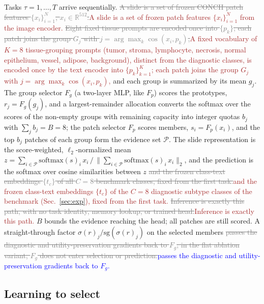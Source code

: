 \documentclass{article}
\newif\ifmarkup \markuptrue
\newcommand{\repc}[3]{\ifmarkup\textcolor{gray}{\sout{#2}}\textcolor{#1}{#3}\else#3\fi}
\newcommand{\repB}[2]{\repc{brown}{#1}{#2}}   %
\newcommand{\repL}[2]{\repc{blue}{#1}{#2}}    %
\newcommand{\Fg}{F_g}
\newcommand{\Fp}{F_p}
\newcommand{\Psel}{\mathcal{P}}
\begin{document}
Tasks $\tau=1,\ldots,T$ arrive sequentially. \repB{A slide is a set of frozen CONCH patch features $\{x_i\}_{i=1}^{N}$, $x_i\in\mathbb{R}^{512}$.}{A slide is a set of frozen patch features $\{x_i\}_{i=1}^{N}$ from the image encoder.} \repB{Eight fixed tissue prompts are encoded once into $\{p_k\}$; each patch joins the group $G_j$ with $j=\arg\max_k\cos(x_i,p_k)$,}{A fixed vocabulary of $K=8$ tissue-grouping prompts (tumor, stroma, lymphocyte, necrosis, normal epithelium, vessel, adipose, background), distinct from the diagnostic classes, is encoded once by the text encoder into $\{p_k\}_{k=1}^{K}$; each patch joins the group $G_j$ with $j=\arg\max_k\cos(x_i,p_k)$,} and each group is summarized by its mean $g_j$. The group selector $\Fg$ (a two-layer MLP, like $\Fp$) scores the prototypes, $r_j=\Fg(g_j)$, and a largest-remainder allocation converts the softmax over the scores of the non-empty groups with remaining capacity into integer quotas $b_j$ with $\sum_j b_j=B=8$; the patch selector $\Fp$ scores members, $s_i=\Fp(x_i)$, and the top $b_j$ patches of each group form the evidence set $\Psel$. The slide representation is the score-weighted, $\ell_2$-normalized mean $z=\sum_{i\in\Psel}\mathrm{softmax}(s)_i\,x_i\,/\,\bigl\|\sum_{i\in\Psel}\mathrm{softmax}(s)_i\,x_i\bigr\|_2$, and the prediction is the softmax over cosine similarities between $z$ \repB{and the frozen class-text embeddings $\{t_c\}$ of all $C=8$ benchmark classes, fixed from the first task.}{and the frozen class-text embeddings $\{t_c\}$ of the $C=8$ diagnostic subtype classes of the benchmark (Sec.~\ref{sec:exp}), fixed from the first task.} \repB{Inference is exactly this path, with no task identity, memory lookup, or trained head.}{Inference is exactly this path.} $B$ bounds the evidence reaching the head; all patches are still scored. A straight-through factor $\sigma(r)_j/\mathrm{sg}(\sigma(r)_j)$ on the selected members \repL{passes the diagnostic and utility-preservation gradients back to $\Fg$; in the flat ablation variant, $\Fg$ does not enter selection or prediction.}{passes the diagnostic and utility-preservation gradients back to $\Fg$.}



\subsection{Learning to select}
\label{ssec:within}
\end{document}
